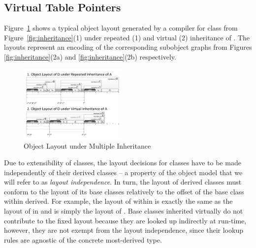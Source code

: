 \subsection{Virtual Table Pointers}
\label{sec:vtp}


Figure~\ref{fig:objlayout} shows a typical object layout generated by a \Cpp{} 
compiler for class  from Figure~\ref{fig:inheritance}(1) under repeated 
(1) and virtual (2) inheritance of . The layouts represent an encoding 
of the corresponding subobject graphs from Figures \ref{fig:inheritance}(2a) and 
\ref{fig:inheritance}(2b) respectively.

\begin{figure}[htbp]
  \centering
    \includegraphics[width=0.47\textwidth]{obj-layout.pdf}
  \caption{Object Layout under Multiple Inheritance}
  \label{fig:objlayout}
\end{figure}

Due to extensibility of classes, the layout decisions for classes have to be 
made independently of their derived classes -- a property of the \Cpp{} object 
model that we will refer to as \emph{layout independence}. In turn, the layout of derived   
classes must conform to the layout of its base classes relatively to the offset 
of the base class within derived. For example, the layout of  within 
 is exactly the same as the layout of  in  and is simply 
the layout of . Base classes inherited virtually do not contribute to 
the fixed layout because they are looked up indirectly at run-time, however, 
they are not exempt from the layout independence, since their lookup rules are 
agnostic of the concrete most-derived type.

